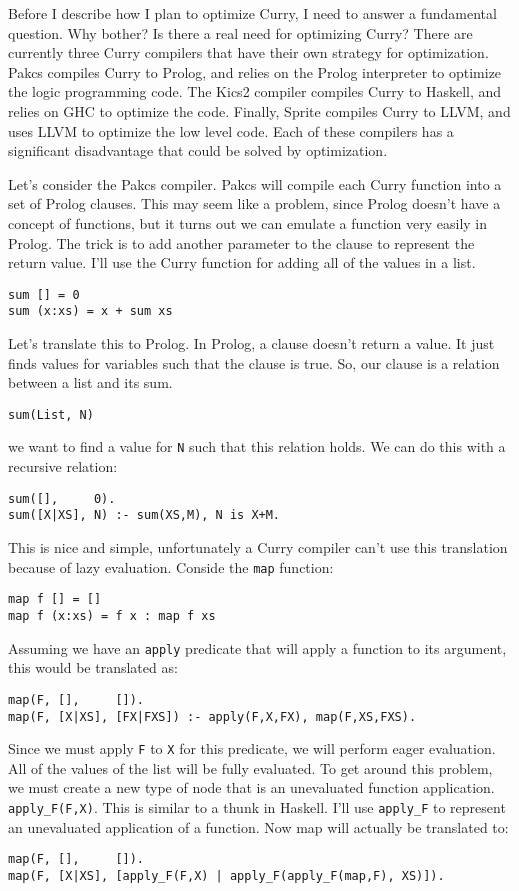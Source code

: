 
Before I describe how I plan to optimize Curry, I need to answer a fundamental question.
Why bother?
Is there a real need for optimizing Curry?
There are currently three Curry compilers that have their own strategy for optimization.
Pakcs compiles Curry to Prolog, and relies on the Prolog interpreter to optimize the logic programming code.
The Kics2 compiler compiles Curry to Haskell, and relies on GHC to optimize the code.
Finally, Sprite compiles Curry to LLVM, and uses LLVM to optimize the low level code.
Each of these compilers has a significant disadvantage that could be solved by optimization.

Let's consider the Pakcs compiler.
Pakcs will compile each Curry function into a set of Prolog clauses.
This may seem like a problem, since Prolog doesn't have a concept of functions,
but it turns out we can emulate a function very easily in Prolog.
The trick is to add another parameter to the clause to represent the return value.
I'll use the Curry function for adding all of the values in a list.

\begin{verbatim}
sum [] = 0
sum (x:xs) = x + sum xs
\end{verbatim}

Let's translate this to Prolog.
In Prolog, a clause doesn't return a value.
It just finds values for variables such that the clause is true.
So, our clause is a relation between a list and its sum.
\begin{verbatim}
sum(List, N)
\end{verbatim}
we want to find a value for \texttt{N} such that this relation holds.
We can do this with a recursive relation:
\begin{verbatim}
sum([],     0).
sum([X|XS], N) :- sum(XS,M), N is X+M.
\end{verbatim}

This is nice and simple, unfortunately a Curry compiler can't use this translation
because of lazy evaluation.
Conside the \texttt{map} function:
\begin{verbatim}
map f [] = []
map f (x:xs) = f x : map f xs
\end{verbatim}
Assuming we have an \texttt{apply} predicate that will apply a function to its argument,
this would be translated as:
\begin{verbatim}
map(F, [],     []).
map(F, [X|XS], [FX|FXS]) :- apply(F,X,FX), map(F,XS,FXS).
\end{verbatim}

Since we must apply \texttt F to \texttt X for this predicate, we will perform eager evaluation.
All of the values of the list will be fully evaluated.
To get around this problem, we must create a new type of node that is an unevaluated function application.
\texttt{apply\_F(F,X)}.
This is similar to a thunk in Haskell.
I'll use \texttt{apply\_F} to represent an unevaluated application of a function.
Now map will actually be translated to:
\begin{verbatim}
map(F, [],     []).
map(F, [X|XS], [apply_F(F,X) | apply_F(apply_F(map,F), XS)]).
\end{verbatim}

